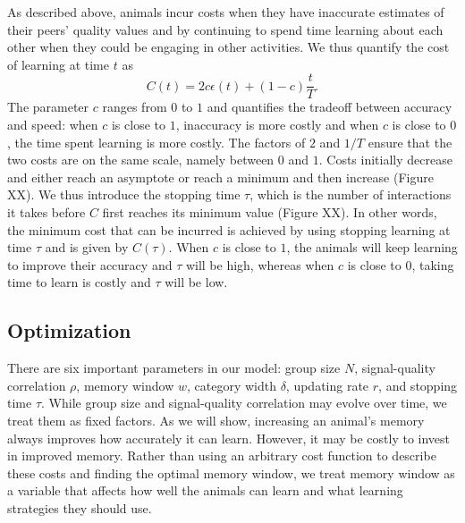 As described above, animals incur costs when they have inaccurate estimates of their peers' quality values and by continuing to spend time learning about each other when they could be engaging in other activities. We thus quantify the cost of learning at time $t$ as 
\begin{equation*}
C(t) = 2c\epsilon(t) +(1-c)\frac{t}{T}.
\end{equation*}  
The parameter $c$ ranges from $0$ to $1$ and quantifies the tradeoff between accuracy and speed: when $c$ is close to $1$, inaccuracy is more costly and when $c$ is close to $0$, the time spent learning is more costly. The factors of $2$ and $1/T$ ensure that the two costs are on the same scale, namely between $0$ and $1$. 
Costs initially decrease and either reach an asymptote or reach a minimum and then increase (Figure XX). We thus introduce the stopping time $\tau$, which is the number of interactions it takes before $C$ first reaches its minimum value (Figure XX). In other words, the minimum cost that can be incurred is achieved by using stopping learning at time $\tau$ and is given by $C(\tau)$. When $c$ is close to $1$, the animals will keep learning to improve their accuracy and $\tau$ will be high, whereas when $c$ is close to $0$, taking time to learn is costly and $\tau$ will be low. 

\subsection{Optimization }

There are six important parameters in our model: group size $N$, signal-quality correlation $\rho$, memory window $w$, category width $\delta$, updating rate $r$, and stopping time $\tau$. While group size and signal-quality correlation may evolve over time, we treat them as fixed factors. As we will show, increasing an animal's memory always improves how accurately it can learn. However, it may be costly to invest in improved memory. Rather than using an arbitrary cost function to describe these costs and finding the optimal memory window, we treat memory window as a variable that affects how well the animals can learn and what learning strategies they should use. 


